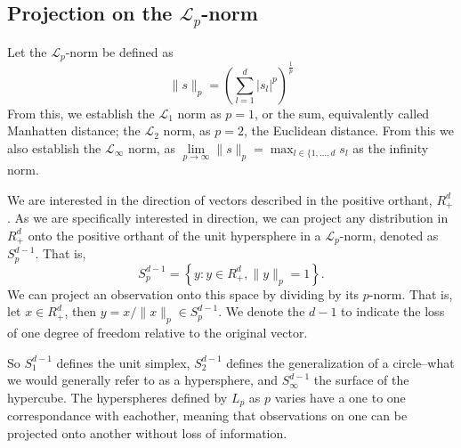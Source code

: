 \subsection{Projection on the $\mathcal{L}_p$-norm}
Let the $\mathcal{L}_p$-norm be defined as
\begin{equation*}
  \lVert s \rVert_p = \left(\sum_{l = 1}^d \lvert s_l\rvert^p\right)^{\frac{1}{p}}
\end{equation*}
From this, we establish the $\mathcal{L}_1$ norm as $p = 1$, or the sum, equivalently called
  Manhatten distance; the $\mathcal{L}_2$ norm, as $p = 2$, the Euclidean distance.  From this we
  also establish the $\mathcal{L}_{\infty}$ norm, as
  $\lim\limits_{p\to\infty} \lVert s \rVert_p = \max_{l\in\lbrace{1,\ldots,d}}s_l$ as the infinity
  norm.

We are interested in the direction of vectors described in the positive orthant, $R_{+}^d$.  As we
  are specifically interested in direction, we can project any distribution in $R_{+}^d$ onto the
  positive orthant of the unit hypersphere in a $\mathcal{L}_p$-norm, denoted as $S_{p}^{d-1}$.
  That is,
  \begin{equation*}
    S_{p}^{d-1} = \left\lbrace y : y \in R_{+}^{d}, \lVert y\rVert_{p} = 1\right\rbrace.
  \end{equation*}
  We can project an observation onto this space by dividing by its $p$-norm.  That is, let
  $x\in R_{+}^{d}$, then $y = x / \lVert x\rVert_p \in S_{p}^{d-1}$.  We denote the $d-1$ to indicate
  the loss of one degree of freedom relative to the original vector.

So $S_{1}^{d-1}$ defines the unit simplex, $S_{2}^{d-1}$ defines the generalization of a
  circle--what we would generally refer to as a hypersphere, and $S_{\infty}^{d-1}$ the surface of
  the hypercube. The hyperspheres defined by $L_p$ as $p$ varies have a one to one correspondance
  with eachother, meaning that observations on one can be projected onto another without loss of
  information.

